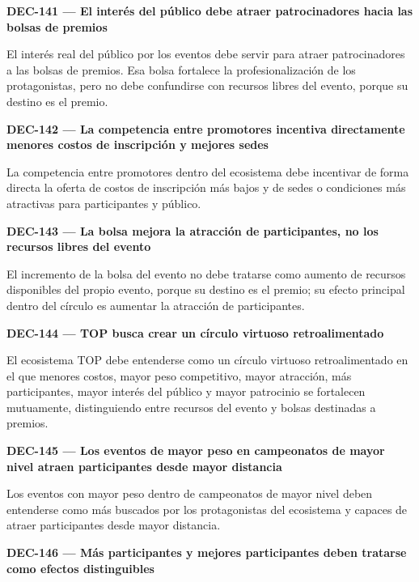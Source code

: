\documentclass[10pt,letterpaper]{article}
\begin{document}
\noindent\textbf{DEC-141 --- El interés del público debe atraer patrocinadores hacia las bolsas de premios}\par
El interés real del público por los eventos debe servir para atraer patrocinadores a las bolsas de premios. Esa bolsa fortalece la profesionalización de los protagonistas, pero no debe confundirse con recursos libres del evento, porque su destino es el premio.\par\vspace{0.45em}
\noindent\textbf{DEC-142 --- La competencia entre promotores incentiva directamente menores costos de inscripción y mejores sedes}\par
La competencia entre promotores dentro del ecosistema debe incentivar de forma directa la oferta de costos de inscripción más bajos y de sedes o condiciones más atractivas para participantes y público.\par\vspace{0.45em}
\noindent\textbf{DEC-143 --- La bolsa mejora la atracción de participantes, no los recursos libres del evento}\par
El incremento de la bolsa del evento no debe tratarse como aumento de recursos disponibles del propio evento, porque su destino es el premio; su efecto principal dentro del círculo es aumentar la atracción de participantes.\par\vspace{0.45em}
\noindent\textbf{DEC-144 --- TOP busca crear un círculo virtuoso retroalimentado}\par
El ecosistema TOP debe entenderse como un círculo virtuoso retroalimentado en el que menores costos, mayor peso competitivo, mayor atracción, más participantes, mayor interés del público y mayor patrocinio se fortalecen mutuamente, distinguiendo entre recursos del evento y bolsas destinadas a premios.\par\vspace{0.45em}
\noindent\textbf{DEC-145 --- Los eventos de mayor peso en campeonatos de mayor nivel atraen participantes desde mayor distancia}\par
Los eventos con mayor peso dentro de campeonatos de mayor nivel deben entenderse como más buscados por los protagonistas del ecosistema y capaces de atraer participantes desde mayor distancia.\par\vspace{0.45em}
\noindent\textbf{DEC-146 --- Más participantes y mejores participantes deben tratarse como efectos distinguibles}\par
\end{document}
